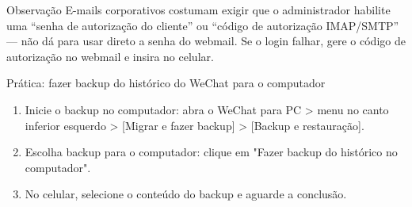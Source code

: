 \begin{tcbinfo}{Observação}
E-mails corporativos costumam exigir que o administrador habilite uma “senha de autorização do cliente” ou “código de autorização IMAP/SMTP” — não dá para usar direto a senha do webmail. Se o login falhar, gere o código de autorização no webmail e insira no celular.

\end{tcbinfo}

\begin{tcbpractice}{Prática: fazer backup do histórico do WeChat para o computador}
\begin{enumerate}
  \item Inicie o backup no computador: abra o WeChat para PC > menu no canto inferior esquerdo > [Migrar e fazer backup] > [Backup e restauração].
  \item Escolha backup para o computador: clique em "Fazer backup do histórico no computador".
  \item No celular, selecione o conteúdo do backup e aguarde a conclusão.
\end{enumerate}

\end{tcbpractice}
